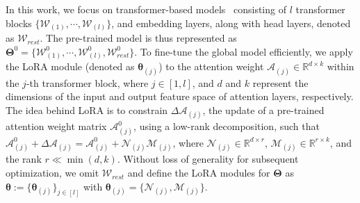 \documentclass[sigconf]{acmart}
\begin{document}
In this work, we focus on transformer-based models~\cite{touvron2023llama,zhang2022opt,devlin2019bert,dosovitskiy2020image} consisting of $l$ transformer blocks $\{\boldsymbol{\mathcal{W}}_{(1)}, \cdots, \boldsymbol{\mathcal{W}}_{(l)}\}$, and embedding layers, along with head layers, denoted as $\boldsymbol{\mathcal{W}}_{rest}$. The pre-trained model is thus represented as $\boldsymbol{\Theta}^0=\{\boldsymbol{\mathcal{W}}_{(1)}^0, \cdots, \boldsymbol{\mathcal{W}}_{(l)}^0, \boldsymbol{\mathcal{W}}_{rest}^0\}$. 
% 
To fine-tune the global model efficiently, we apply the LoRA module (denoted as $\boldsymbol{\theta}_{(j)}$) to the attention weight $\boldsymbol{\mathcal{A}}_{(j)}\in\mathbb{R}^{d \times k}$ within the $j$-th transformer block, where $j\in[1,l]$, and $d$ and $k$ represent the dimensions of the input and output feature space of attention layers, respectively. 
%
The idea behind LoRA is to constrain $\Delta\boldsymbol{\mathcal{A}}_{(j)}$, the update of a pre-trained attention weight matrix $\boldsymbol{\mathcal{A}}_{(j)}^0$, using a low-rank decomposition, such that $\boldsymbol{\mathcal{A}}_{(j)}^0 + \Delta\boldsymbol{\mathcal{A}}_{(j)}=\boldsymbol{\mathcal{A}}_{(j)}^0+\boldsymbol{\mathcal{N}}_{(j)}\boldsymbol{\mathcal{M}}_{(j)}$, where $\boldsymbol{\mathcal{N}}_{(j)}\in\mathbb{R}^{d \times r}$, $\boldsymbol{\mathcal{M}}_{(j)}\in\mathbb{R}^{r \times k}$, and the rank $r \ll \min(d, k)$. Without loss of generality for subsequent optimization, we omit $\boldsymbol{\mathcal{W}}_{rest}$ and define the LoRA modules for $\boldsymbol{\Theta}$ 
as $\boldsymbol{\theta} := \{ \boldsymbol{\theta}_{(j)}\}_{j\in[l]}$ with $\boldsymbol{\theta}_{(j)} = \{\boldsymbol{\mathcal{N}}_{(j)},\boldsymbol{\mathcal{M}}_{(j)}\}$.
\end{document}
